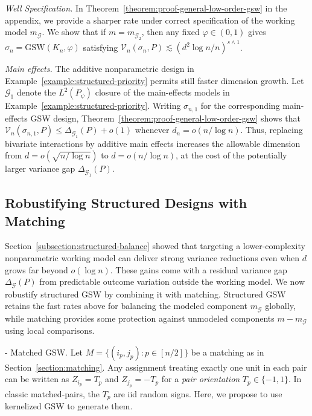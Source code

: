\documentclass[letterpaper,12pt]{article}
\makeatletter
\theoremstyle{definition}
\numberwithin{equation}{section}
\newcommand{\mc}{\mathcal}
\renewcommand{\paragraph}{\@startsection{paragraph}{4}{\z@}%
  {\medskipamount}%
  {-\fontdimen2\font}%
  {\normalfont\normalsize\bfseries}}
\makeatother
\begin{document}
\emph{Well Specification.} In Theorem~\ref{theorem:proof-general-low-order-gsw} in the appendix, we provide a sharper rate under correct specification of the working model $m_{\mc G}$.
We show that if $m=m_{\mc G_2}$, then any fixed $\varphi\in(0,1)$ gives $\sigma_n=\mathrm{GSW}(K_n,\varphi)$ satisfying $\mc V_n(\sigma_n,P)\lesssim(d^2\log n/n)^{s\wedge1}$.

\smallskip

\emph{Main effects.}
The additive nonparametric design in Example~\ref{example:structured-priority} permits still faster dimension growth.
Let $\mc G_1$ denote the $L^2(P_\psi)$ closure of the main-effects models in Example~\ref{example:structured-priority}.
Writing $\sigma_{n,1}$ for the corresponding main-effects GSW design, Theorem~\ref{theorem:proof-general-low-order-gsw} shows that $\mc V_n(\sigma_{n,1},P)\leq\Delta_{\mc G_1}(P)+o(1)$ whenever $d_n=o(n/\log n)$.
Thus, replacing bivariate interactions by additive main effects increases the allowable dimension from $d = o(\sqrt{n/\log n})$ to $d = o(n/\log n)$, at the cost of the potentially larger variance gap $\Delta_{\mc G_1}(P)$.

\subsection{Robustifying Structured Designs with Matching}\label{subsection:matching-structured-balance}

Section~\ref{subsection:structured-balance} showed that targeting a lower-complexity nonparametric working model can deliver strong variance reductions even when $d$ grows far beyond $o(\log n)$.
These gains come with a residual variance gap $\Delta_{\mc G}(P)$ from predictable outcome variation outside the working model.
We now robustify structured GSW by combining it with matching.
Structured GSW retains the fast rates above for balancing the modeled component $m_{\mc G}$ globally, while matching provides some protection against unmodeled components $m - m_{\mc G}$ using local comparisons.

\paragraph{Matched GSW.} Let $M=\{(i_p,j_p):p\in[n/2]\}$ be a matching as in Section~\ref{section:matching}.
Any assignment treating exactly one unit in each pair can be written as $Z_{i_p}=T_p$ and $Z_{j_p}=-T_p$ for a \emph{pair orientation} $T_p\in\{-1,1\}$.
In classic matched-pairs, the $T_p$ are iid random signs.
Here, we propose to use kernelized GSW to generate them.
\end{document}
